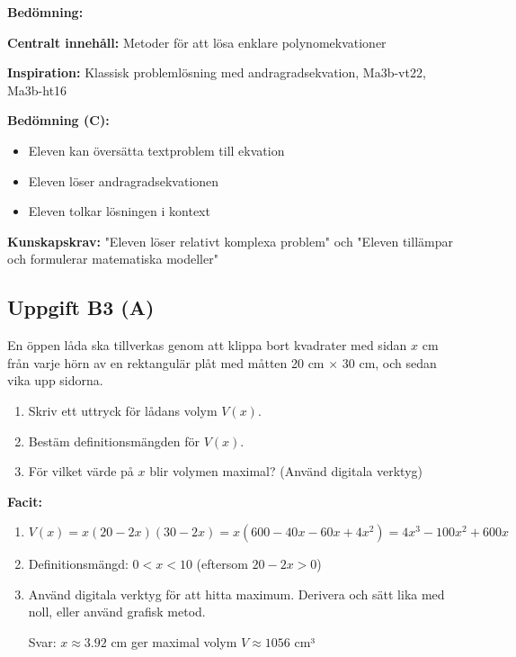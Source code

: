 \documentclass[12pt]{article}
\begin{document}
\begin{refbox}
\textbf{Bedömning:}

\textbf{Centralt innehåll:} Metoder för att lösa enklare polynomekvationer

\textbf{Inspiration:} Klassisk problemlösning med andragradsekvation, Ma3b-vt22, Ma3b-ht16

\textbf{Bedömning (C):}
\begin{itemize}
    \item Eleven kan översätta textproblem till ekvation
    \item Eleven löser andragradsekvationen
    \item Eleven tolkar lösningen i kontext
\end{itemize}

\textbf{Kunskapskrav:} "Eleven löser relativt komplexa problem" och "Eleven tillämpar och formulerar matematiska modeller"
\end{refbox}

\subsection*{Uppgift B3 (A)}
En öppen låda ska tillverkas genom att klippa bort kvadrater med sidan $x$ cm från varje hörn av en rektangulär plåt med måtten 20 cm × 30 cm, och sedan vika upp sidorna.
\begin{enumerate}[label=\alph*)]
    \item Skriv ett uttryck för lådans volym $V(x)$.
    \item Bestäm definitionsmängden för $V(x)$.
    \item För vilket värde på $x$ blir volymen maximal? (Använd digitala verktyg)
\end{enumerate}

\begin{facitbox}
\textbf{Facit:}

\begin{enumerate}[label=\alph*)]
    \item $V(x) = x(20 - 2x)(30 - 2x) = x(600 - 40x - 60x + 4x^2) = 4x^3 - 100x^2 + 600x$
    \item Definitionsmängd: $0 < x < 10$ (eftersom $20 - 2x > 0$)
    \item Använd digitala verktyg för att hitta maximum. Derivera och sätt lika med noll, eller använd grafisk metod.
    
    Svar: $x \approx 3.92$ cm ger maximal volym $V \approx 1056$ cm³
\end{enumerate}
\end{facitbox}
\end{document}
